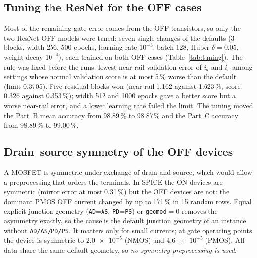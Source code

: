 \subsection{Tuning the ResNet for the OFF cases}\label{sec:models:tuning}
Most of the remaining gate error comes from the OFF transistors, so only the two ResNet OFF models were tuned: seven single changes of the defaults (3 blocks, width 256, 500 epochs, learning rate $10^{-3}$, batch 128, Huber $\delta=0.05$, weight decay $10^{-4}$), each trained on both OFF cases (Table~\ref{tab:tuning}). The rule was fixed before the runs: lowest near-rail validation error of $i_d$ and $i_s$ among settings whose normal validation score is at most 5\,\% worse than the default (limit 0.3705). Five residual blocks won (near-rail 1.162 against 1.623\,\%, score 0.326 against 0.353\,\%); width 512 and 1000 epochs gave a better score but a worse near-rail error, and a lower learning rate failed the limit. The tuning moved the Part~B mean accuracy from 98.89\,\% to 98.87\,\% and the Part~C accuracy from 98.89\,\% to 99.00\,\%.
\begin{table}[t]
\caption{ResNet tuning for the OFF cases (validation). Score: mean median error (\%); near-rail: mean error of $i_d,i_s$ on near-rail validation rows (\%); the rule selects blocks=5.}
\label{tab:tuning}
\centering\footnotesize
\setlength{\tabcolsep}{4pt}
\fitcol{}
\end{table}

\ifexpSymmetry
\subsection{Drain--source symmetry of the OFF devices}\label{sec:models:symmetry}
A MOSFET is symmetric under exchange of drain and source, which would allow a preprocessing that orders the terminals. In SPICE the ON devices are symmetric (mirror error at most 0.31\,\%) but the OFF devices are not: the dominant PMOS OFF current changed by up to 171\,\% in 15 random rows. Equal explicit junction geometry (\texttt{AD}=\texttt{AS}, \texttt{PD}=\texttt{PS}) or \texttt{geomod}$=0$ removes the asymmetry exactly, so the cause is the default junction geometry of an instance without \texttt{AD/AS/PD/PS}. It matters only for small currents; at gate operating points the device is symmetric to $\num{2.0e-5}$ (NMOS) and $\num{4.6e-5}$ (PMOS). All data share the same default geometry, so \emph{no symmetry preprocessing is used}.
\fi
